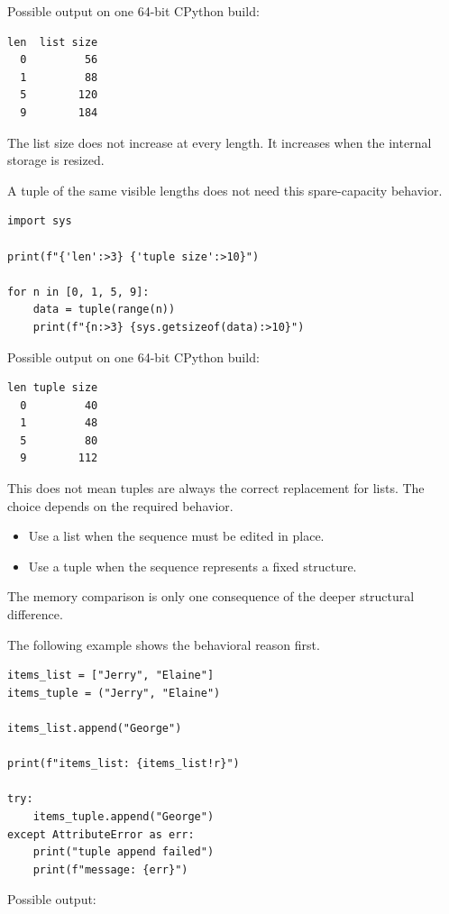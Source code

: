 Possible output on one 64-bit CPython build:

\begin{verbatim}
len  list size
  0         56
  1         88
  5        120
  9        184
\end{verbatim}

The list size does not increase at every length. It increases when the internal storage is resized.

A tuple of the same visible lengths does not need this spare-capacity behavior.

\begin{verbatim}
import sys

print(f"{'len':>3} {'tuple size':>10}")

for n in [0, 1, 5, 9]:
    data = tuple(range(n))
    print(f"{n:>3} {sys.getsizeof(data):>10}")
\end{verbatim}

Possible output on one 64-bit CPython build:

\begin{verbatim}
len tuple size
  0         40
  1         48
  5         80
  9        112
\end{verbatim}

This does not mean tuples are always the correct replacement for lists. The choice depends on the required behavior.

\begin{itemize}
    \item Use a list when the sequence must be edited in place.
    \item Use a tuple when the sequence represents a fixed structure.
\end{itemize}

The memory comparison is only one consequence of the deeper structural difference.

The following example shows the behavioral reason first.

\begin{verbatim}
items_list = ["Jerry", "Elaine"]
items_tuple = ("Jerry", "Elaine")

items_list.append("George")

print(f"items_list: {items_list!r}")

try:
    items_tuple.append("George")
except AttributeError as err:
    print("tuple append failed")
    print(f"message: {err}")
\end{verbatim}

Possible output:

